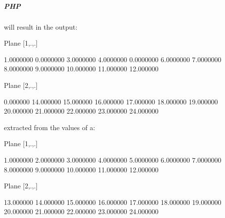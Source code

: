 \subparagraph*{P\-H\-P}


 will result in the output\-: 
\begin{DoxyCode}
Plane [1,.,.]

       1.0000000        0.0000000        3.0000000        4.0000000
       0.0000000        6.0000000        7.0000000        8.0000000
       9.0000000        10.000000        11.000000        12.000000

Plane [2,.,.]

        0.000000        14.000000        15.000000        16.000000
       17.000000        18.000000        19.000000        20.000000
       21.000000        22.000000        23.000000        24.000000
\end{DoxyCode}
 extracted from the values of a\-: 
\begin{DoxyCode}
Plane [1,.,.]

       1.0000000        2.0000000        3.0000000        4.0000000
       5.0000000        6.0000000        7.0000000        8.0000000
       9.0000000        10.000000        11.000000        12.000000

Plane [2,.,.]

       13.000000        14.000000        15.000000        16.000000
       17.000000        18.000000        19.000000        20.000000
       21.000000        22.000000        23.000000        24.000000
\end{DoxyCode}



